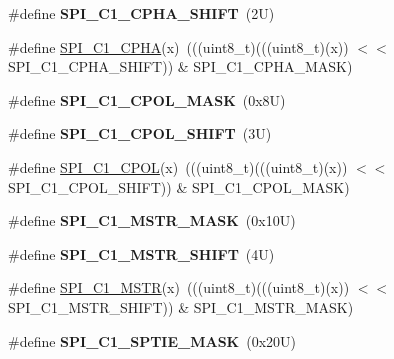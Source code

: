 \begin{DoxyCompactItemize}
\#define {\bfseries S\+P\+I\+\_\+\+C1\+\_\+\+C\+P\+H\+A\+\_\+\+S\+H\+I\+FT}~(2\+U)
\item 
\#define \mbox{\hyperlink{group___s_p_i___register___masks_gaf4bbb2b1501a8e5ee3b477185ab538b5}{S\+P\+I\+\_\+\+C1\+\_\+\+C\+P\+HA}}(x)~(((uint8\+\_\+t)(((uint8\+\_\+t)(x)) $<$$<$ S\+P\+I\+\_\+\+C1\+\_\+\+C\+P\+H\+A\+\_\+\+S\+H\+I\+FT)) \& S\+P\+I\+\_\+\+C1\+\_\+\+C\+P\+H\+A\+\_\+\+M\+A\+SK)
\item 
\mbox{\label{group___s_p_i___register___masks_ga8f4bd038e37f3581231f26aafc33c7b1}} 
\#define {\bfseries S\+P\+I\+\_\+\+C1\+\_\+\+C\+P\+O\+L\+\_\+\+M\+A\+SK}~(0x8\+U)
\item 
\mbox{\label{group___s_p_i___register___masks_ga1d5b3d92574037e1073a569653cf5a9b}} 
\#define {\bfseries S\+P\+I\+\_\+\+C1\+\_\+\+C\+P\+O\+L\+\_\+\+S\+H\+I\+FT}~(3\+U)
\item 
\#define \mbox{\hyperlink{group___s_p_i___register___masks_ga0e6a70266bbca9942a76d605f95c2ee8}{S\+P\+I\+\_\+\+C1\+\_\+\+C\+P\+OL}}(x)~(((uint8\+\_\+t)(((uint8\+\_\+t)(x)) $<$$<$ S\+P\+I\+\_\+\+C1\+\_\+\+C\+P\+O\+L\+\_\+\+S\+H\+I\+FT)) \& S\+P\+I\+\_\+\+C1\+\_\+\+C\+P\+O\+L\+\_\+\+M\+A\+SK)
\item 
\mbox{\label{group___s_p_i___register___masks_ga747d64528ec249cad76dc87b67e457e6}} 
\#define {\bfseries S\+P\+I\+\_\+\+C1\+\_\+\+M\+S\+T\+R\+\_\+\+M\+A\+SK}~(0x10\+U)
\item 
\mbox{\label{group___s_p_i___register___masks_ga67f4db47142cf9e5cb239db0f5af79d7}} 
\#define {\bfseries S\+P\+I\+\_\+\+C1\+\_\+\+M\+S\+T\+R\+\_\+\+S\+H\+I\+FT}~(4\+U)
\item 
\#define \mbox{\hyperlink{group___s_p_i___register___masks_ga49dfc10c0d68490d8e9a952f51000c4a}{S\+P\+I\+\_\+\+C1\+\_\+\+M\+S\+TR}}(x)~(((uint8\+\_\+t)(((uint8\+\_\+t)(x)) $<$$<$ S\+P\+I\+\_\+\+C1\+\_\+\+M\+S\+T\+R\+\_\+\+S\+H\+I\+FT)) \& S\+P\+I\+\_\+\+C1\+\_\+\+M\+S\+T\+R\+\_\+\+M\+A\+SK)
\item 
\mbox{\label{group___s_p_i___register___masks_ga9a819839ef92c4a16fcbe0403dada66a}} 
\#define {\bfseries S\+P\+I\+\_\+\+C1\+\_\+\+S\+P\+T\+I\+E\+\_\+\+M\+A\+SK}~(0x20\+U)
\item 
$$
\end{DoxyCompactItemize}
